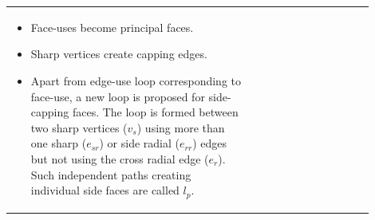 \begin{tabular}[htp]{@{}p{0.6\linewidth} p{0.3\linewidth}@{}} 

	\begin{itemize}
	[noitemsep,topsep=2pt,parsep=2pt,partopsep=2pt,leftmargin=*]
	\item Face-uses become principal faces. 
 
\item Sharp vertices create capping edges.

\item Apart from edge-use loop corresponding to face-use, a new loop is proposed for side-capping faces. The loop is formed between two sharp vertices ($v_s$) using  more than one sharp  ($e_{sr}$) or side radial ($e_{rr}$) edges but not using the cross radial edge ($e_r$). Such independent paths creating individual side faces are called $l_p$.


\end{itemize}
\end{tabular}
